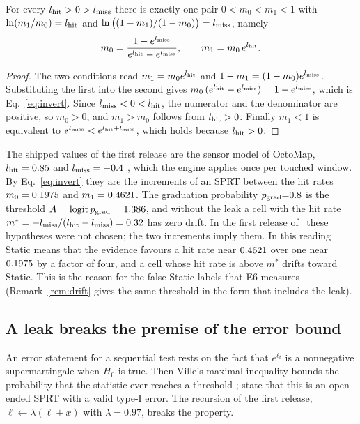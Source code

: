 \begin{proposition}\label{prop:invert}
For every $l_{\mathrm{hit}}>0>l_{\mathrm{miss}}$ there is exactly one pair $0<m_0<m_1<1$ with $\ln(m_1/m_0)=l_{\mathrm{hit}}$ and $\ln\big((1-m_1)/(1-m_0)\big)=l_{\mathrm{miss}}$, namely
\begin{equation}\label{eq:invert}
  m_0=\frac{1-e^{l_{\mathrm{miss}}}}{e^{l_{\mathrm{hit}}}-e^{l_{\mathrm{miss}}}},\qquad m_1=m_0\,e^{l_{\mathrm{hit}}}.
\end{equation}
\end{proposition}
\begin{proof}
The two conditions read $m_1=m_0e^{l_{\mathrm{hit}}}$ and $1-m_1=(1-m_0)e^{l_{\mathrm{miss}}}$. Substituting the first into the second gives $m_0\,(e^{l_{\mathrm{hit}}}-e^{l_{\mathrm{miss}}})=1-e^{l_{\mathrm{miss}}}$, which is Eq.~\eqref{eq:invert}. Since $l_{\mathrm{miss}}<0<l_{\mathrm{hit}}$, the numerator and the denominator are positive, so $m_0>0$, and $m_1>m_0$ follows from $l_{\mathrm{hit}}>0$. Finally $m_1<1$ is equivalent to $e^{l_{\mathrm{miss}}}<e^{l_{\mathrm{hit}}+l_{\mathrm{miss}}}$, which holds because $l_{\mathrm{hit}}>0$.
\end{proof}

The shipped values of the first release are the sensor model of OctoMap, $l_{\mathrm{hit}}=0.85$ and $l_{\mathrm{miss}}=-0.4$ \citep{hornung2013octomap}, which the engine applies once per touched window. By Eq.~\eqref{eq:invert} they are the increments of an SPRT between the hit rates $m_0=0.1975$ and $m_1=0.4621$. The graduation probability $p_{\mathrm{grad}}{=}0.8$ is the threshold $A=\operatorname{logit}p_{\mathrm{grad}}=1.386$, and without the leak a cell with the hit rate $m^\ast=-l_{\mathrm{miss}}/(l_{\mathrm{hit}}-l_{\mathrm{miss}})=0.32$ has zero drift. In the first release of \sname\ these hypotheses were not chosen; the two increments imply them. In this reading Static means that the evidence favours a hit rate near $0.4621$ over one near $0.1975$ by a factor of four, and a cell whose hit rate is above $m^\ast$ drifts toward Static. This is the reason for the false Static labels that E6 measures (Remark~\ref{rem:drift} gives the same threshold in the form that includes the leak).

\subsection{A leak breaks the premise of the error bound}\label{subsec:leak}

An error statement for a sequential test rests on the fact that $e^{\ell_t}$ is a nonnegative supermartingale when $H_0$ is true. Then Ville's maximal inequality bounds the probability that the statistic ever reaches a threshold \citep[Lemma~1]{howard2020timeuniform}; \citet[Section~4.6]{howard2020timeuniform} state that this is an open-ended SPRT with a valid type-I error. The recursion of the first release, $\ell\leftarrow\lambda(\ell+x)$ with $\lambda=0.97$, breaks the property.

